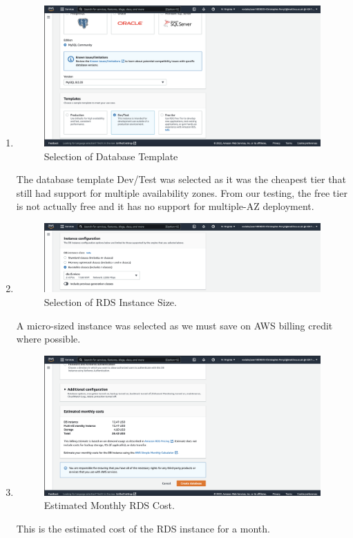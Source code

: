 \begin{enumerate}
    \item
    \begin{figure}[H]
        \centering
        \includegraphics[width=\textwidth]{resources/rds/rds-templates}
        \caption{Selection of Database Template}
        \label{fig:rds-templates}
    \end{figure}\nolinebreak
    The database template Dev/Test was selected as it was the cheapest tier that still had support for multiple availability zones. From our testing, the free tier is not actually free and it has no support for multiple-AZ deployment.

    \item
    \begin{figure}[H]
        \centering
        \includegraphics[width=\textwidth]{resources/rds/rds-instance-config}
        \caption{Selection of RDS Instance Size.}
        \label{fig:rds-instance-conf}
    \end{figure}\nolinebreak
    \nolinebreak
    A micro-sized instance was selected as we must save on AWS billing credit where possible.

    \item
    \begin{figure}[H]
        \centering
        \includegraphics[width=\textwidth]{resources/rds/rds-monthly-costs}
        \caption{Estimated Monthly RDS Cost.}
        \label{fig:rds-costs}
    \end{figure}\nolinebreak
    \nolinebreak
    This is the estimated cost of the RDS instance for a month.


\end{enumerate}

